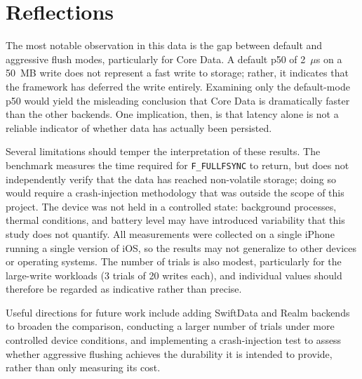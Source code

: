 \section{Reflections}
The most notable observation in this data is the gap between default
and aggressive flush modes, particularly for Core Data. A default p50
of 2~$\mu$s on a 50~MB write does not represent a fast write to
storage; rather, it indicates that the framework has deferred the
write entirely. Examining only the default-mode p50 would yield the
misleading conclusion that Core Data is dramatically faster than the
other backends. One implication, then, is that latency alone is not a
reliable indicator of whether data has actually been persisted.

Several limitations should temper the interpretation of these
results. The benchmark measures the time required for
\verb|F_FULLFSYNC| to return, but does not independently verify that
the data has reached non-volatile storage; doing so would require a
crash-injection methodology that was outside the scope of this
project. The device was not held in a controlled state: background
processes, thermal conditions, and battery level may have introduced
variability that this study does not quantify. All measurements were
collected on a single iPhone running a single version of iOS, so the
results may not generalize to other devices or operating systems. The
number of trials is also modest, particularly for the large-write
workloads (3 trials of 20 writes each), and individual values should
therefore be regarded as indicative rather than precise.

Useful directions for future work include adding SwiftData and Realm
backends to broaden the comparison, conducting a larger number of
trials under more controlled device conditions, and implementing a
crash-injection test to assess whether aggressive flushing achieves
the durability it is intended to provide, rather than only measuring
its cost.






